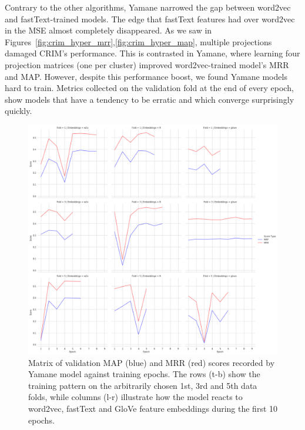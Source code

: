 Contrary to the other algorithms, Yamane narrowed the gap between word2vec and fastText-trained models.  The edge that fastText features had over word2vec in the \ac{MSE} almost completely disappeared.  As we saw in Figures~\ref{fig:crim_hyper_mrr},\ref{fig:crim_hyper_map}, multiple projections damaged CRIM's performance.  This is contrasted in Yamane, where learning four projection matrices (one per cluster) improved word2vec-trained model's \ac{MRR} and \ac{MAP}.  However, despite this performance boost, we found Yamane models hard to train.  Metrics collected on the validation fold at the end of every epoch, show models that have a tendency to be erratic and which converge surprisingly quickly.  
\begin{figure}[ht!] 
  \centering
  \includegraphics[width=.85\linewidth]{images/Yamane_training_patterns.png}
  \caption[Validation MAP and MRR  scores recorded by Yamane model against the training epochs on three different training data folds using word2vec, fastText and GloVe features]{Matrix of validation MAP (blue) and MRR (red) scores recorded by Yamane model against training epochs.  The rows (t-b) show the training pattern on the arbitrarily chosen 1st, 3rd and 5th data folds, while columns (l-r) illustrate how the model reacts to word2vec, fastText and GloVe feature embeddings during the first 10 epochs.}
  \label{fig:yamane_training_patterns}
\end{figure}
